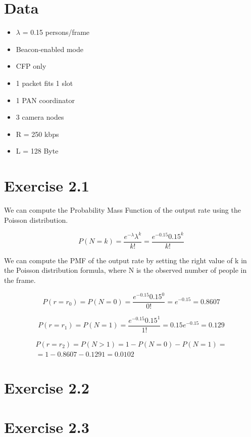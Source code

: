 \section{Data}
\begin{itemize}
\item $\lambda$ = 0.15 persons/frame
\item Beacon-enabled mode
\item CFP only
\item 1 packet fits 1 slot
\item 1 PAN coordinator
\item 3 camera nodes
\item R = 250 kbps
\item L = 128 Byte
\end{itemize}

\section{Exercise 2.1}
We can compute the Probability Mass Function of the output rate using the Poisson distribution.

\begin{equation}
P(N = k) = \frac{e^{-\lambda} \lambda^k}{k!} = \frac{e^{-0.15} 0.15^k}{k!}
\end{equation}

We can compute the PMF of the output rate by setting the right value of k in the Poisson distribution formula, where N is the observed number of people in the frame.

\begin{equation}
P(r = r_0) = P(N = 0) = \frac{e^{-0.15} 0.15^0}{0!} = e^{-0.15} = 0.8607
\end{equation}

\begin{equation}
P(r = r_1) = P(N = 1) = \frac{e^{-0.15} 0.15^1}{1!} = 0.15 e^{-0.15} = 0.129
\end{equation}

\begin{equation}
\begin{split}
	P(r = r_2) = P(N > 1) = 1 - P(N = 0) - P(N = 1) = \\
	= 1- 0.8607 - 0.1291 = 0.0102
\end{split}
\end{equation}


\section{Exercise 2.2}

\section{Exercise 2.3}